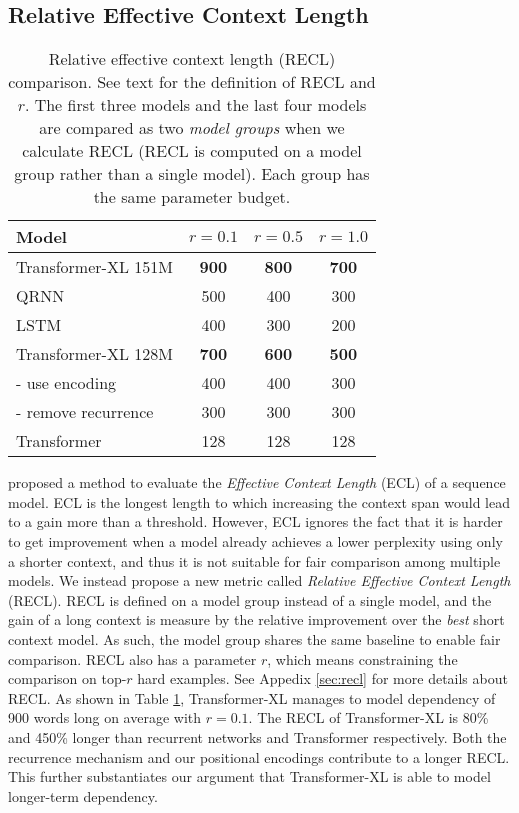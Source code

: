 \subsection{Relative Effective Context Length}
\bgroup
\setlength{\tabcolsep}{2pt}
\begin{table}[t]
	\small
	\centering
	\begin{tabular}{lccc}
		\toprule
		\bf Model & $r=0.1$ & $r=0.5$ & $r=1.0$ \\
		\midrule
		Transformer-XL 151M & \textbf{900} & \textbf{800} & \textbf{700} \\
		QRNN & 500 & 400 & 300 \\
		LSTM & 400 & 300 & 200 \\
		\midrule
		Transformer-XL 128M & \textbf{700} & \textbf{600} & \textbf{500} \\
		- use \citet{shaw2018self} encoding & 400 & 400 & 300 \\
		- remove recurrence & 300 & 300 & 300 \\
		Transformer & 128 & 128 & 128 \\
		\bottomrule
	\end{tabular}
	\caption{\small
		Relative effective context length (RECL) comparison. See text for the definition of RECL and $r$. The first three models and the last four models are
		compared as two \textit{model groups} when we calculate RECL (RECL is computed on a model group rather than a single model). Each group has the same parameter budget.
	}
	\label{table:recl}
\end{table}
\egroup

\citet{khandelwal2018sharp} proposed a method to evaluate the \textit{Effective Context Length} (ECL) of a sequence model.
ECL is the longest length to which increasing the context span would lead to a gain more than a threshold.
However, ECL ignores the fact that it is harder to get improvement when a model already achieves a lower perplexity using only a shorter context, and thus it is not suitable for fair comparison among multiple models. We instead propose a new metric called \textit{Relative Effective Context Length} (RECL). RECL is defined on a model group instead of a single model, and the gain of a long context is measure by the relative improvement over the \textit{best} short context model. As such, the model group shares the same baseline to enable fair comparison. RECL also has a parameter $r$, which means constraining the comparison on top-$r$ hard examples. See Appedix \ref{sec:recl} for more details about RECL. As shown in Table \ref{table:recl}, Transformer-XL manages to model dependency of 900 words long on average with $r = 0.1$. The RECL of Transformer-XL is 80\% and 450\% longer than recurrent networks and Transformer respectively. Both the recurrence mechanism and our positional encodings contribute to a longer RECL. This further substantiates our argument that Transformer-XL is able to model longer-term dependency.

